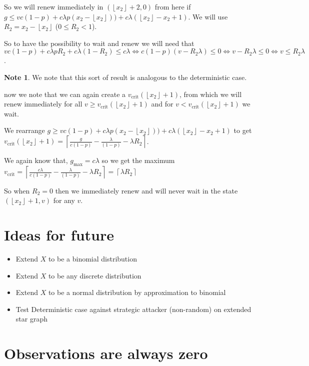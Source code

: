 \documentclass[a4paper,10pt]{article}
\newcommand{\floor}[1]{\left \lfloor #1 \right \rfloor}
\newcommand{\ceil}[1]{\left \lceil #1 \right \rceil}
\theoremstyle{definition}
\theoremstyle{definition}
\theoremstyle{remark}
\theoremstyle{definition}
\newtheorem*{note}{Note}
\begin{document}
So we will renew immediately in $(\floor{x_{2}}+2,0)$ from here if $ g \leq vc(1-p)+ c \lambda p(x_{2}-\floor{x_{2}})) + c \lambda (\floor{x_{2}}-x_{2}+1) $. We will use $R_{2}=x_{2}-\floor{x_{2}}$ ($0 \leq R_{2} < 1$).

So to have the possibility to wait and renew we will need that $vc(1-p) + c \lambda p R_{2} + c \lambda (1-R_{2}) \leq c \lambda \iff c(1-p)(v-R_{2} \lambda) \leq 0 \iff v- R_{2} \lambda \leq 0 \iff v \leq R_{2} \lambda$.

\begin{note}
We note that this sort of result is analogous to the deterministic case.
\end{note}

now we note that we can again create a $v_{\text{crit}}(\floor{x_{2}}+1)$, from which we will renew immediately for all  $v \geq v_{\text{crit}}(\floor{x_{2}}+1)$ and for $v < v_{\text{crit}}(\floor{x_{2}}+1)$ we wait.

We rearrange $g \geq vc(1-p)+ c \lambda p(x_{2}-\floor{x_{2}})) + c \lambda (\floor{x_{2}}-x_{2}+1)$ to get $v_{\text{crit}}(\floor{x_{2}}+1)=\ceil{\frac{g}{c(1-p)}- \frac{\lambda}{(1-p)} -\lambda R_{2}}$.

We again know that, $g_{\text{max}}= c \lambda$ so we get the maximum $v_{\text{crit}}=\ceil{\frac{c \lambda}{c (1-p)} - \frac{\lambda}{(1-p)}- \lambda R_{2}}=\ceil{\lambda R_{2}}$

So when $R_{2}=0$ then we immediately renew and will never wait in the state $(\floor{x_{2}}+1,v)$ for any $v$.


\section{Ideas for future}
\begin{itemize}
\item Extend $X$ to be a binomial distribution
\item Extend $X$ to be any discrete distribution
\item Extend $X$ to be a normal distribution by approximation to binomial
\item Test Deterministic case against strategic attacker (non-random) on extended star graph
\end{itemize}


\appendix
{}
\appendixpage
\addappheadtotoc
\section{Observations are always zero}
\label{Observations are always zero}
\end{document}
